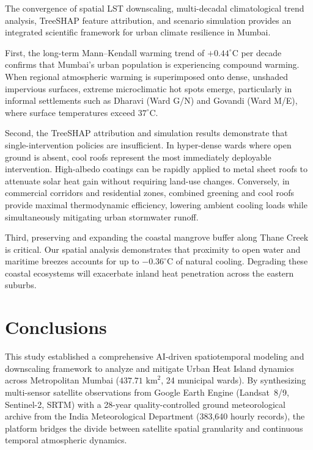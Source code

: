 \documentclass[a4paper,fleqn]{cas-sc}
\begin{document}
The convergence of spatial LST downscaling, multi-decadal climatological trend analysis, TreeSHAP feature attribution, and scenario simulation provides an integrated scientific framework for urban climate resilience in Mumbai.

First, the long-term Mann--Kendall warming trend of $+0.44^\circ\text{C}$ per decade confirms that Mumbai's urban population is experiencing compound warming. When regional atmospheric warming is superimposed onto dense, unshaded impervious surfaces, extreme microclimatic hot spots emerge, particularly in informal settlements such as Dharavi (Ward G/N) and Govandi (Ward M/E), where surface temperatures exceed $37^\circ\text{C}$.

Second, the TreeSHAP attribution and simulation results demonstrate that single-intervention policies are insufficient. In hyper-dense wards where open ground is absent, cool roofs represent the most immediately deployable intervention. High-albedo coatings can be rapidly applied to metal sheet roofs to attenuate solar heat gain without requiring land-use changes. Conversely, in commercial corridors and residential zones, combined greening and cool roofs provide maximal thermodynamic efficiency, lowering ambient cooling loads while simultaneously mitigating urban stormwater runoff.

Third, preserving and expanding the coastal mangrove buffer along Thane Creek is critical. Our spatial analysis demonstrates that proximity to open water and maritime breezes accounts for up to $-0.36^\circ\text{C}$ of natural cooling. Degrading these coastal ecosystems will exacerbate inland heat penetration across the eastern suburbs.

\section{Conclusions}
\label{sec:conclusions}

This study established a comprehensive AI-driven spatiotemporal modeling and downscaling framework to analyze and mitigate Urban Heat Island dynamics across Metropolitan Mumbai ($437.71\text{ km}^2$, 24 municipal wards). By synthesizing multi-sensor satellite observations from Google Earth Engine (Landsat~8/9, Sentinel-2, SRTM) with a 28-year quality-controlled ground meteorological archive from the India Meteorological Department (383,640 hourly records), the platform bridges the divide between satellite spatial granularity and continuous temporal atmospheric dynamics.
\end{document}

